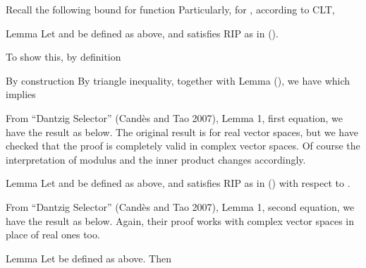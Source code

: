 Recall the following bound for  function
Particularly, for , according to CLT,

\color[red]{(To be done)}

\Result
{Lemma}
{
Let  and  be defined as above, and  satisfies RIP as in ().
}

To show this, by definition

By construction
By triangle inequality, together with Lemma (), we have
which implies

From ``Dantzig Selector'' (Cand\`es and Tao 2007), Lemma 1, first equation, we have the result as below.
The original result is for real vector spaces, but we have checked that the proof is completely valid in complex vector spaces.
Of course the interpretation of modulus and the inner product changes accordingly.

\Result
{Lemma}
{
Let  and  be defined as above, and  satisfies RIP as in () with respect to .
}

From ``Dantzig Selector'' (Cand\`es and Tao 2007), Lemma 1, second equation, we have the result as below.
Again, their proof works with complex vector spaces in place of real ones too.

\Result
{Lemma}
{
Let  be defined as above.
Then
}

